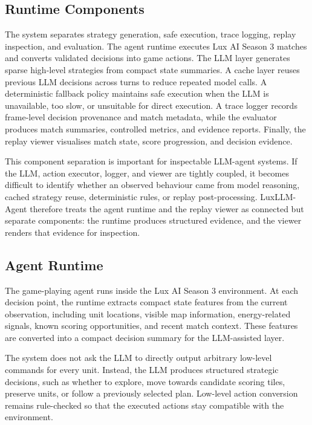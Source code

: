 \documentclass[11pt]{article}
\begin{document}
\subsection{Runtime Components}

The system separates strategy generation, safe execution, trace logging, replay inspection, and evaluation. The agent runtime executes Lux AI Season 3 matches and converts validated decisions into game actions. The LLM layer generates sparse high-level strategies from compact state summaries. A cache layer reuses previous LLM decisions across turns to reduce repeated model calls. A deterministic fallback policy maintains safe execution when the LLM is unavailable, too slow, or unsuitable for direct execution. A trace logger records frame-level decision provenance and match metadata, while the evaluator produces match summaries, controlled metrics, and evidence reports. Finally, the replay viewer visualises match state, score progression, and decision evidence.

This component separation is important for inspectable LLM-agent systems. If the LLM, action executor, logger, and viewer are tightly coupled, it becomes difficult to identify whether an observed behaviour came from model reasoning, cached strategy reuse, deterministic rules, or replay post-processing. LuxLLM-Agent therefore treats the agent runtime and the replay viewer as connected but separate components: the runtime produces structured evidence, and the viewer renders that evidence for inspection.

\subsection{Agent Runtime}

The game-playing agent runs inside the Lux AI Season 3 environment. At each decision point, the runtime extracts compact state features from the current observation, including unit locations, visible map information, energy-related signals, known scoring opportunities, and recent match context. These features are converted into a compact decision summary for the LLM-assisted layer.

The system does not ask the LLM to directly output arbitrary low-level commands for every unit. Instead, the LLM produces structured strategic decisions, such as whether to explore, move towards candidate scoring tiles, preserve units, or follow a previously selected plan. Low-level action conversion remains rule-checked so that the executed actions stay compatible with the environment.
\end{document}
